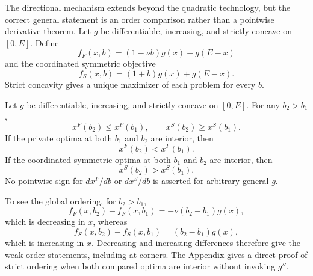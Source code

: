 The directional mechanism extends beyond the quadratic technology, but the correct general statement is an order comparison rather than a pointwise derivative theorem. Let $g$ be differentiable, increasing, and strictly concave on $[0,E]$. Define
\begin{equation}
 f_F(x,b)=(1-\nu b)g(x)+g(E-x)
 \label{eq:generalprivateobjective}
\end{equation}
and the coordinated symmetric objective
\begin{equation}
 f_S(x,b)=(1+b)g(x)+g(E-x).
 \label{eq:coordinatedproblem}
\end{equation}
Strict concavity gives a unique maximizer of each problem for every $b$.

\begin{proposition}\label{prop:wedge}
Let $g$ be differentiable, increasing, and strictly concave on $[0,E]$. For any $b_2>b_1$,
\begin{equation}
 x^F(b_2)\leq x^F(b_1),
 \qquad
 x^S(b_2)\geq x^S(b_1).
 \label{eq:generalweakordering}
\end{equation}
If the private optima at both $b_1$ and $b_2$ are interior, then
\begin{equation}
 x^F(b_2)<x^F(b_1).
 \label{eq:generalstrictprivate}
\end{equation}
If the coordinated symmetric optima at both $b_1$ and $b_2$ are interior, then
\begin{equation}
 x^S(b_2)>x^S(b_1).
 \label{eq:generalstrictcoordinated}
\end{equation}
No pointwise sign for $dx^F/db$ or $dx^S/db$ is asserted for arbitrary general $g$.
\end{proposition}

To see the global ordering, for $b_2>b_1$,
\begin{equation}
 f_F(x,b_2)-f_F(x,b_1)=-\nu(b_2-b_1)g(x),
 \label{eq:privatedifferences}
\end{equation}
which is decreasing in $x$, whereas
\begin{equation}
 f_S(x,b_2)-f_S(x,b_1)=(b_2-b_1)g(x),
 \label{eq:coordinateddifferences}
\end{equation}
which is increasing in $x$. Decreasing and increasing differences therefore give the weak order statements, including at corners. The Appendix gives a direct proof of strict ordering when both compared optima are interior without invoking $g''$.

